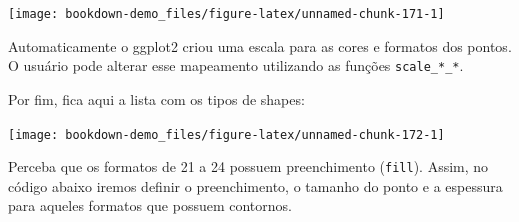 \documentclass[]{book}
\newenvironment{Shaded}{\begin{snugshade}}{\end{snugshade}}
\newcommand{\KeywordTok}[1]{\textcolor[rgb]{0.13,0.29,0.53}{\textbf{#1}}}
\newcommand{\DataTypeTok}[1]{\textcolor[rgb]{0.13,0.29,0.53}{#1}}
\newcommand{\DecValTok}[1]{\textcolor[rgb]{0.00,0.00,0.81}{#1}}
\newcommand{\StringTok}[1]{\textcolor[rgb]{0.31,0.60,0.02}{#1}}
\newcommand{\OperatorTok}[1]{\textcolor[rgb]{0.81,0.36,0.00}{\textbf{#1}}}
\newcommand{\NormalTok}[1]{#1}
\begin{document}
\begin{Shaded}
\end{Shaded}

\begin{center}\texttt{[image: bookdown-demo\_files/figure-latex/unnamed-chunk-171-1]} \end{center}

Automaticamente o ggplot2 criou uma escala para as cores e formatos dos
pontos. O usuário pode alterar esse mapeamento utilizando as funções
\texttt{scale\_*\_*}.

Por fim, fica aqui a lista com os tipos de shapes:

\begin{center}\texttt{[image: bookdown-demo\_files/figure-latex/unnamed-chunk-172-1]} \end{center}

Perceba que os formatos de 21 a 24 possuem preenchimento
(\texttt{fill}). Assim, no código abaixo iremos definir o preenchimento,
o tamanho do ponto e a espessura para aqueles formatos que possuem
contornos.
\end{document}
